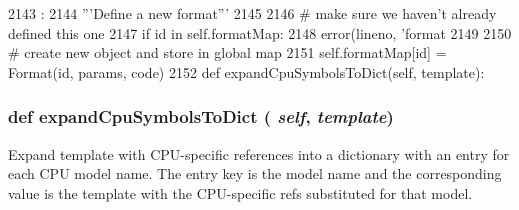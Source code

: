 \begin{DoxyCode}
2143                                                  :
2144         '''Define a new format'''
2145 
2146         # make sure we haven't already defined this one
2147         if id in self.formatMap:
2148             error(lineno, 'format %
2149 
2150         # create new object and store in global map
2151         self.formatMap[id] = Format(id, params, code)
2152 
    def expandCpuSymbolsToDict(self, template):
\end{DoxyCode}
\hypertarget{classisa__parser_1_1ISAParser_a79be34860ed1ccdfa7c4a377aa9ca42b}{
\subsubsection[{expandCpuSymbolsToDict}]{\setlength{\rightskip}{0pt plus 5cm}def expandCpuSymbolsToDict ( {\em self}, \/   {\em template})}}
\label{classisa__parser_1_1ISAParser_a79be34860ed1ccdfa7c4a377aa9ca42b}
\begin{DoxyVerb}Expand template with CPU-specific references into a
dictionary with an entry for each CPU model name.  The entry
key is the model name and the corresponding value is the
template with the CPU-specific refs substituted for that
model.\end{DoxyVerb}
 


